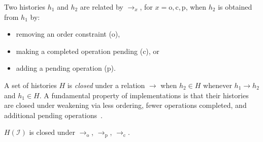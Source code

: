 Two histories $h_1$ and $h_2$ are related by $\to_x$, for $x = \mathrm{o},
\mathrm{c}, \mathrm{p}$, when $h_2$ is obtained from $h_1$ by:
\begin{itemize}

  \item removing an order constraint (o),

  \item making a completed operation pending (c), or

  \item adding a pending operation (p).

\end{itemize}
A set of histories $H$ is \emph{closed} under a relation $\to$ when $h_2 \in H$
whenever $h_1 \to h_2$ and $h_1 \in H$. A fundamental property of
implementations is that their histories are closed under weakening via less
ordering, fewer operations completed, and additional pending
operations~\cite{conf/popl/BouajjaniEEH15}.

\begin{lemma}

  $H(\mathcal{I})$ is closed under $\to_\mathrm{o}$, $\to_\mathrm{p}$, 
  $\to_\mathrm{c}$.

\end{lemma}
